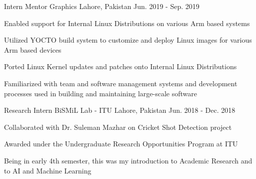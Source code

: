 \begin{cventries}
  \cventry
    {Intern} %
    {Mentor Graphics} %
    {Lahore, Pakistan} %
    {Jun. 2019 - Sep. 2019} %
    {
      \begin{cvitems} %
        \item Enabled support for Internal Linux Distributions on various Arm based systems
        \item Utilized YOCTO build system to customize and deploy Linux images for various Arm based devices
        \item Ported Linux Kernel updates and patches onto Internal Linux Distributions
        \item Familiarized with team and software management systems and development processes used in building and maintaining large-scale software
      \end{cvitems}
    }

  \cventry
    {Research Intern} %
    {BiSMiL Lab - ITU} %
    {Lahore, Pakistan} %
    {Jun. 2018 - Dec. 2018} %
    {
      \begin{cvitems} %
        \item Collaborated with Dr. Suleman Mazhar on Cricket Shot Detection project
        \item Awarded under the Undergraduate Research Opportunities Program at ITU
        \item Being in early 4th semester, this was my introduction to Academic Research and to AI and Machine Learning
      \end{cvitems}
    }

\end{cventries}
